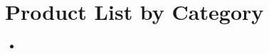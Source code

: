 \documentclass[12pt,a4paper]{article} %
\begin{document}
\section{Product List by Category}
    \begin{itemize}
    \item {}
    \end{itemize}
\end{document}
